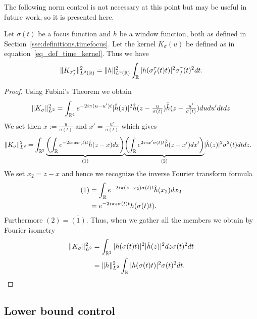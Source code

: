 The following norm control is not necessary at this point but may be useful in future work, so it is presented here.
\begin{prop}
	Let $\sigma(t)$ be a focus function and $h$ be a window function, both as defined in Section~\ref{sse:definitions.timefocus}. Let the kernel $K_\sigma(u)$ be defined as in equation~\eqref{eq_def_time_kernel}. Thus we have
	\begin{equation}
		\|K_{\sigma_f^\tau} \|_{L^2(\mathbb{R})}^2 = \|h\|_{L^2(\mathbb{R})}^2 \int_{\mathbb{R}} |h(\sigma_f^\tau(t)t)|^2\sigma_f^\tau(t)^2 dt.
	\end{equation}
\end{prop}
\begin{proof}
	Using Fubini's Theorem we obtain
	\begin{equation*}
		\|K_\sigma\|_{L^2}^2 = \int_{\mathbb{R}^4} e^{-2i\pi(u-u')t}|\hat{h}(z)|^2\hat{h}(z-\tfrac{u}{\sigma(t)})\bar{\hat{h}}(z-\tfrac{u'}{\sigma(t)})dudu'dtdz
	\end{equation*}
	We set then $x:=\tfrac{u}{\sigma(t)}$ and $x'=\tfrac{u'}{\sigma(t)}$ which gives
	\begin{align*}
		\|K_\sigma\|_{L^2}^2  &= \int_{\mathbb{R}^2} \underset{(1)}{\underbrace{\left( \int_{\mathbb{R}} e^{-2i\pi x\sigma(t)t}\hat{h}(z-x)dx \right)}}\underset{(2)}{\underbrace{\left( \int_{\mathbb{R}} e^{2i\pi x'\sigma(t)t}\bar{\hat{h}}(z-x')dx' \right)}}|\hat{h}(z)|^2 \sigma^2(t)dtdz.
	\end{align*}
	We set $x_2=z-x$ and hence we recognize the inverse Fourier transform formula
	\begin{align*}
		(1) &= \int_{\mathbb{R}} e^{-2i\pi(z-x_2)\sigma(t)t}\hat{h}(x_2)dx_2 \\
		& = e^{-2i\pi z\sigma(t)t}h(\sigma(t)t).
	\end{align*}
	Furthermore $(2) = \overline{(1)} $. Thus, when we gather all the members we obtain by Fourier isometry
	\begin{align*}
		\|K_\sigma\|_{L^2}^2 &= \int_{\mathbb{R}^2} |h(\sigma(t)t)|^2 |\hat{h}(z)|^2 dz \sigma(t)^2dt \\
		& = \|h\|_{L^2}^2 \int_{\mathbb{R}} |h(\sigma(t)t)|^2\sigma(t)^2 dt.
	\end{align*}
\end{proof}




\subsection{Lower bound control}

